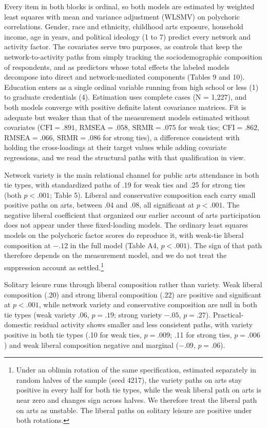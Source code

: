 \documentclass[
  12pt
]{article}
\begin{document}
Every item in both blocks is ordinal, so both models are estimated by weighted least squares with mean and variance adjustment (WLSMV) on polychoric correlations. Gender, race and ethnicity, childhood arts exposure, household income, age in years, and political ideology (1 to 7) predict every network and activity factor. The covariates serve two purposes, as controls that keep the network-to-activity paths from simply tracking the sociodemographic composition of respondents, and as predictors whose total effects the labeled models decompose into direct and network-mediated components (Tables 9 and 10). Education enters as a single ordinal variable running from high school or less (1) to graduate credentials (4). Estimation uses complete cases (N = 1,227), and both models converge with positive definite latent covariance matrices. Fit is adequate but weaker than that of the measurement models estimated without covariates ($\text{CFI} = .891$, $\text{RMSEA} = .058$, $\text{SRMR} = .075$ for weak ties; $\text{CFI} = .862$, $\text{RMSEA} = .066$, $\text{SRMR} = .086$ for strong ties), a difference consistent with holding the cross-loadings at their target values while adding covariate regressions, and we read the structural paths with that qualification in view.

Network variety is the main relational channel for public arts attendance in both tie types, with standardized paths of .19 for weak ties and .25 for strong ties (both $p < .001$; Table 5). Liberal and conservative composition each carry small positive paths on arts, between .04 and .08, all significant at $p < .001$. The negative liberal coefficient that organized our earlier account of arts participation does not appear under these fixed-loading models. The ordinary least squares models on the polychoric factor scores do reproduce it, with weak-tie liberal composition at $-.12$ in the full model (Table A4, $p < .001$). The sign of that path therefore depends on the measurement model, and we do not treat the suppression account as settled.\footnote{Under an oblimin rotation of the same specification, estimated separately in random halves of the sample (seed 4217), the variety paths on arts stay positive in every half for both tie types, while the weak liberal path on arts is near zero and changes sign across halves. We therefore treat the liberal path on arts as unstable. The liberal paths on solitary leisure are positive under both rotations.}

Solitary leisure runs through liberal composition rather than variety. Weak liberal composition (.20) and strong liberal composition (.22) are positive and significant at $p < .001$, while network variety and conservative composition are null in both tie types (weak variety .06, $p = .19$; strong variety $-.05$, $p = .27$). Practical-domestic residual activity shows smaller and less consistent paths, with variety positive in both tie types (.10 for weak ties, $p = .009$; .11 for strong ties, $p = .006$) and weak liberal composition negative and marginal ($-.09$, $p = .06$).
\end{document}

